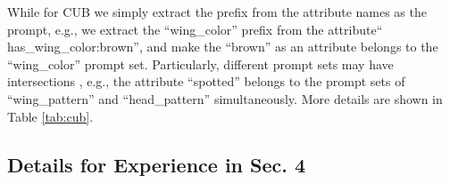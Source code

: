 \documentclass[letterpaper]{article} \usepackage{aaai23}  \usepackage{times}  \usepackage{helvet}  \usepackage{courier}  \usepackage[hyphens]{url}  \usepackage{graphicx} \urlstyle{rm} \def\UrlFont{\rm}  \usepackage{natbib}  \usepackage{caption} \frenchspacing  \setlength{\pdfpagewidth}{8.5in}  \setlength{\pdfpageheight}{11in}  \usepackage{algorithm}
\begin{document}
While for CUB \cite{welinder2010caltech} we simply extract the prefix from the attribute names as the prompt, e.g., we extract the ``wing\_color'' prefix from the attribute`` has\_wing\_color:brown'', and make the ``brown'' as an attribute belongs to the ``wing\_color'' {prompt set.}
Particularly, different {prompt sets}
may  have intersection{s} 
, e.g., the attribute ``spotted'' belongs to {the prompt sets of} ``wing\_pattern'' and ``head\_pattern'' 
simultaneously.
{More} details are shown in Table \ref{tab:cub}.


\subsection{Details for Experience in Sec. 4}\label{apd:hyp}

\begin{table}[htbp]
\small
\caption{{Dataset statistics.} `` Pro.'' and `` Att.'' {refer} to the number of prompt sets and attributes in each dataset. S/U denotes the seen/unseen class. 
}
\label{tab:dataset}
\vspace{-10pt}
\begin{center}
\end{center}
\label{tab:data}
\vspace{-8pt}
\end{table}
\end{document}

